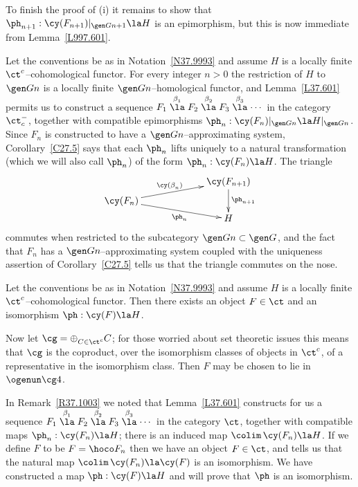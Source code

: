 \documentclass[11pt]{amsart}
\begin{document}
To finish the proof of
(i) it remains to show that $\ph_{n+1}:\cy(F_{n+1})|_{\gen G{n+1}}\la H$ is
an epimorphism, but this is now immediate from
Lemma~\ref{L997.601}.
\eprf

Let the conventions be as in Notation~\ref{N37.9993} and assume
$H$ is a locally finite $\ct^c$--cohomological functor.
For every integer
$n>0$ the restriction of $H$ to $\gen Gn$ is a locally finite
$\gen Gn$--homological functor,
and Lemma~\ref{L37.601} permits us to construct a
sequence $F_1\stackrel{\beta_1^{}}\la F_2
\stackrel{\beta_2^{}}\la F_3\stackrel{\beta_3^{}}\la\cdots$ in the
category $\ct^-_c$, together with compatible
epimorphisms $\ph_n:\cy(F_n)|_{\gen Gn}\la H|_{\gen Gn}$.
Since $F_n$ is constructed to have a $\gen Gn$--approximating
system, Corollary~\ref{C27.5} says that each $\ph_n$ lifts
uniquely to a natural transformation (which we will also call $\ph_n$)
of the form $\ph_n:\cy(F_n)\la H$. The triangle
\[\xymatrix@C+40pt@R-20pt{
    & \cy(F_{n+1}) \ar[dd]^{\ph_{n+1}}\\
  \cy(F_{n}) \ar[rd]_-{\ph_{n}}
  \ar[ur]^-{\cy(\beta_{n}^{})} & \\
  & H
}\]
commutes when restricted to the subcategory $\gen Gn\subset\gen G{}$,
and the fact that $F_n$ has a $\gen Gn$--approximating system
coupled with the uniqueness assertion of Corollary~\ref{C27.5}
tells us that the triangle commutes on the nose.
\ermk


Let the conventions be as in Notation~\ref{N37.9993} and assume
$H$ is a locally finite $\ct^c$--cohomological functor.
Then there exists an object $F\in\ct$ and an isomorphism
$\ph:\cy(F)\la H$.

Now let $\cg=\oplus_{C\in\ct^c}^{}C$; for those worried about set theoretic
issues this means that $\cg$ is the coproduct, over the isomorphism
classes of objects in $\ct^c$, of a representative in the
isomorphism class. Then $F$ may be chosen to lie in $\ogenun \cg4$.
\epro

\prf
In Remark~\ref{R37.1003} we noted
that 
Lemma~\ref{L37.601} constructs for us a
sequence
$F_1\stackrel{\beta_1^{}}\la F_2
\stackrel{\beta_2^{}}\la F_3\stackrel{\beta_3^{}}\la\cdots$
in the
category $\ct$, together with compatible
maps $\ph_n:\cy(F_n)\la H$;
there is an induced map
$\colim\,\cy(F_n)\la H$.
If we define $F$ to be  $F=\hoco F_n$ then we have an
object $F\in\ct$, and 
\cite[Lemma~2.8]{Neeman96} tells
us that the natural map
$\colim\,\cy(F_n)\la\cy(F)$
is an isomorphism. We have constructed a map
$\ph:\cy(F)\la H$ and will prove that
$\ph$ is an isomorphism.
\end{document}
